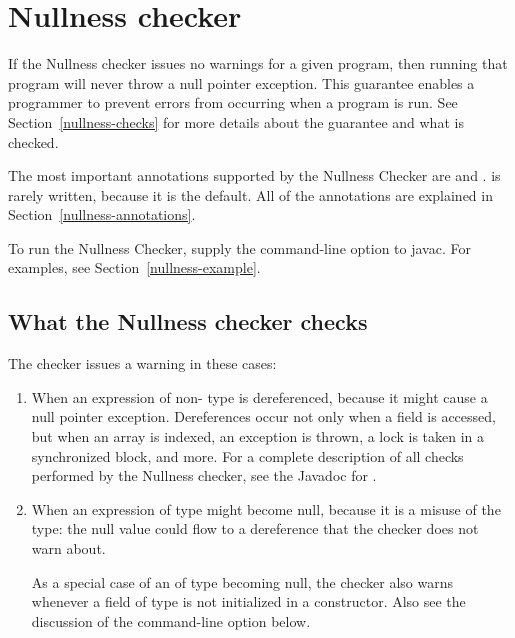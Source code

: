 \htmlhr
\chapter{Nullness checker\label{nullness-checker}}

If the Nullness checker issues no warnings for a given program, then
running that program will never throw a null pointer exception.  This
guarantee enables a programmer to prevent errors from occurring when a
program is run.  See Section~\ref{nullness-checks} for more details about
the guarantee and what is checked.

The most important annotations supported by the Nullness Checker are 
 and 
.
 is rarely written, because it is
the default.  All of the annotations are explained in
Section~\ref{nullness-annotations}.

To run the Nullness Checker, supply the  command-line option to javac.  For
examples, see Section~\ref{nullness-example}.


\section{What the Nullness checker checks\label{nullness-checks}}

The checker issues a warning in these cases:

\begin{enumerate}

\item
  When an expression of non- type
  is dereferenced, because it might cause a null pointer exception.
  Dereferences occur not only when a field is accessed, but when an array
  is indexed, an exception is thrown, a lock is taken in a synchronized
  block, and more.  For a complete description of all checks performed by
  the Nullness checker, see the Javadoc for
  .

\item
  When an expression of  type
  might become null, because it
  is a misuse of the type:  the null value could flow to a dereference that
  the checker does not warn about.

  As a special case of an of 
  type becoming null, the checker also warns whenever a field of
   type is not initialized in a
  constructor.  Also see the discussion of the 
  command-line option below.

\end{enumerate}

